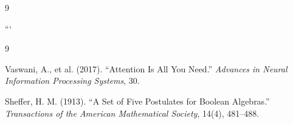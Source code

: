 \documentclass[11pt]{article}
\theoremstyle{definition}
\begin{document}
\begin{thebibliography}{9}




































```













\begin{thebibliography}{9}












Vaswani, A., et al. (2017). ``Attention Is All You Need.'' \emph{Advances in Neural Information Processing Systems}, 30.



















Sheffer, H. M. (1913). ``A Set of Five Postulates for Boolean Algebras.'' \emph{Transactions of the American Mathematical Society}, 14(4), 481--488.














\end{thebibliography}
\end{thebibliography}
\end{document}
